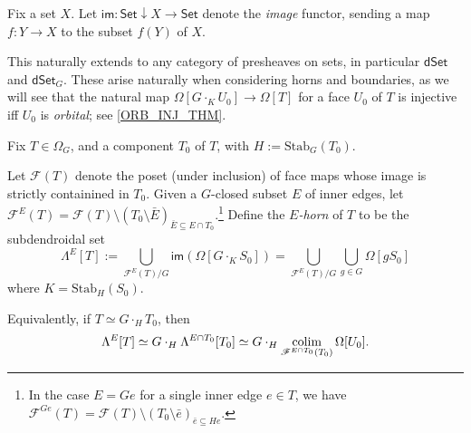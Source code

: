 \documentclass[a4paper,10pt,draft]{article}%
\numberwithin{equation}{section}%
\numberwithin{figure}{section}
\begin{document}
\begin{definition}
      Fix a set $X$.
      Let $\mathsf{im}: \mathsf{Set} \downarrow X \to \mathsf{Set}$
      denote the \textit{image} functor,
      sending a map $f:Y \to X$ to the subset $f(Y)$ of $X$.
\end{definition}

\begin{remark}
      This naturally extends to any category of presheaves on sets,
      in particular $\mathsf{dSet}$ and $\mathsf{dSet}_G$.
      These arise naturally when considering horns and boundaries, as we will see that the natural map
      $\Omega[G \cdot_K U_0] \to \Omega[T]$
      for a face $U_0$ of $T$ is injective iff $U_0$ is \textit{orbital}; see \cref{ORB_INJ_THM}.      
\end{remark}


\begin{definition}
      Fix $T\in \Omega_G$, and a component $T_0$ of $T$, with $H := \mathrm{Stab}_G(T_0)$.
      
      Let $\mathscr{F}(T)$ denote the poset (under inclusion) of face maps whose image is
      strictly containined in $T_0$.
      Given a $G$-closed subset $E$ of inner edges, let
      $\mathscr{F}^{E}(T) = \mathscr{F}(T) \setminus (T_0 \setminus \bar E)_{\bar E \subseteq E \cap T_0}$.\footnote{
        In the case $E = G e$ for a single inner edge $e \in T$, we have
      $\mathscr{F}^{G e}(T) = \mathscr{F}(T) \setminus (T_0 \setminus \bar e)_{\bar e \subseteq H e}$.}
      Define the \textit{$E$-horn} of $T$ to be the subdendroidal set
      \begin{equation}
            \Lambda^{E}[T] := \mathop{\bigcup}\limits_{\mathscr{F}^E(T)/G}\mathsf{im}\left(\Omega[G \cdot_K S_0]\right)
            = \mathop{\bigcup}\limits_{\mathscr{F}^E(T)/G}\mathop{\bigcup}\limits_{g \in G}\Omega[g S_0]
      \end{equation}
      where $K = \mathrm{Stab}_H(S_0)$.
  \end{definition}

\begin{remark}
      Equivalently, if $T \simeq G \cdot_H T_0$, then
      \begin{equation}
            \Lambda^{E}[T] \simeq G \cdot_H \Lambda^{E \cap T_0}[T_0]
            \simeq G \cdot_H \mathop{\operatorname{colim}}\limits_{\mathscr{F}^{E \cap T_0}(T_0)}\Omega[U_0].
      \end{equation}
\end{remark}
\end{document}
